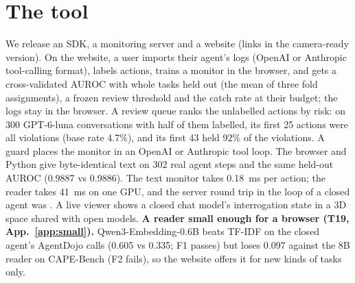 \documentclass{article}
\begin{document}
\section{The tool}
\label{sec:tool}
We release an SDK, a monitoring server and a website (links in the camera-ready version).
On the website, a user imports their agent's logs (OpenAI or Anthropic tool-calling format), labels actions, trains a monitor in the browser, and gets a cross-validated AUROC with whole tasks held out (the mean of three fold assignments), a frozen review threshold and the catch rate at their budget; the logs stay in the browser. A review queue ranks the unlabelled actions by risk: on 300 GPT-6-luna conversations with half of them labelled, its first 25 actions were all violations (base rate 4.7\%), and its first 43 held 92\% of the violations. A guard places the monitor in an OpenAI or Anthropic tool loop.
The browser and Python give byte-identical text on 302 real agent steps and the same held-out AUROC (0.9887 vs 0.9886).
The text monitor takes 0.18~ms per action; the reader takes 41~ms on one GPU, and the server round trip in the loop of a closed agent was \LATENCY.
A live viewer shows a closed chat model's interrogation state in a 3D space shared with open models.
\textbf{A reader small enough for a browser (T19, App.~\ref{app:small}).} Qwen3-Embedding-0.6B beats TF-IDF on the closed agent's AgentDojo calls (0.605 vs 0.335; F1 passes) but loses 0.097 against the 8B reader on CAPE-Bench (F2 fails), so the website offers it for new kinds of tasks only.


\end{document}
